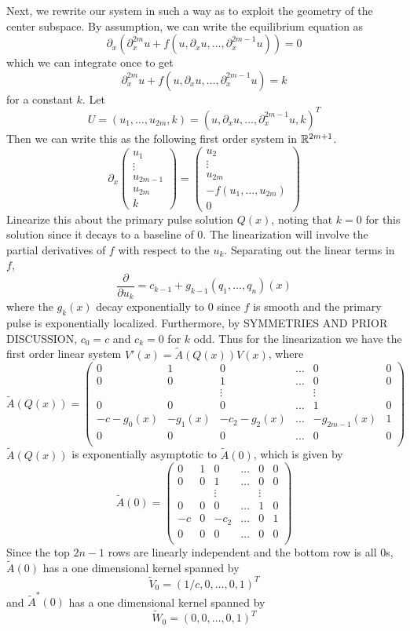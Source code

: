 \documentclass[thesis.tex]{subfiles}
\begin{document}
Next, we rewrite our system in such a way as to exploit the geometry of the center subspace. By assumption, we can write the equilibrium equation as
\[
\partial_x( \partial_x^{2m}u + f(u, \partial_x u, \dots, \partial_x^{2m-1}u)) = 0
\]
which we can integrate once to get
\[
\partial_x^{2m}u + f(u, \partial_x u, \dots, \partial_x^{2m-1}u) = k
\]
for a constant $k$. Let
\[
U = (u_1, \dots, u_{2m}, k ) = 
(u, \partial_x u, \dots, \partial_x^{2m-1} u, k)^T
\]
Then we can write this as the following first order system in $\mathbb{R}^{2m+1}$.
\[
\partial_x
\begin{pmatrix}u_1 \\ \vdots \\ u_{2m-1} \\ u_{2m} \\ k \end{pmatrix} = 
\begin{pmatrix}
u_2 \\ \vdots \\ u_{2m} \\ -f(u_1, \dots, u_{2m}) \\ 0 
\end{pmatrix} 
\]
Linearize this about the primary pulse solution $Q(x)$, noting that $k = 0$ for this solution since it decays to a baseline of 0. The linearization will involve the partial derivatives of $f$ with respect to the $u_k$. Separating out the linear terms in $f$, 
\[
\frac{\partial}{\partial u_k} = c_{k-1} + g_{k-1}(q_1, \dots, q_n)(x)
\]
where the $g_k(x)$ decay exponentially to 0 since $f$ is smooth and the primary pulse is exponentially localized. Furthermore, by SYMMETRIES AND PRIOR DISCUSSION, $c_0 = c$ and $c_k = 0$ for $k$ odd. Thus for the linearization we have the first order linear system $V'(x) = \tilde{A}(Q(x))V(x)$, where
\[
\tilde{A}(Q(x)) = 
\begin{pmatrix}
0 & 1 & 0 & \dots & 0 & 0\\
0 & 0 & 1 & \dots & 0 & 0\\
&& \vdots && \vdots \\
0 & 0 & 0 & \dots & 1 & 0\\
-c - g_0(x) & -g_1(x) & -c_2 - g_2(x) & \dots 
& -g_{2m-1}(x) & 1 \\
0 & 0 & 0 & \dots & 0 & 0 \\
\end{pmatrix}
\]
$\tilde{A}(Q(x))$ is exponentially asymptotic to $\tilde{A}(0)$, which is given by
\[
\tilde{A}(0) = 
\begin{pmatrix}
0 & 1 & 0 & \dots & 0 & 0\\
0 & 0 & 1 & \dots & 0 & 0\\
&& \vdots && \vdots \\
0 & 0 & 0 & \dots & 1 & 0\\
-c & 0 & -c_2 & \dots 
& 0 & 1 \\
0 & 0 & 0 & \dots & 0 & 0 \\
\end{pmatrix}
\]
Since the top $2n-1$ rows are linearly independent and the bottom row is all 0s, $\tilde{A}(0)$ has a one dimensional kernel spanned by
\[
\tilde{V}_0 = (1/c, 0, \dots, 0, 1)^T
\]
and $\tilde{A}^*(0)$ has a one dimensional kernel spanned by
\[
\tilde{W}_0 = (0, 0, \dots, 0, 1)^T
\]
\end{document}
